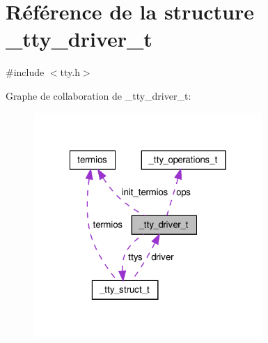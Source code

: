 \hypertarget{struct__tty__driver__t}{\section{Référence de la structure \-\_\-tty\-\_\-driver\-\_\-t}
\label{struct__tty__driver__t}
}


{\ttfamily \#include $<$tty.\-h$>$}



Graphe de collaboration de \-\_\-tty\-\_\-driver\-\_\-t\-:\nopagebreak
\begin{figure}[H]
\begin{center}
\leavevmode
\includegraphics[width=247pt]{struct__tty__driver__t__coll__graph}
\end{center}
\end{figure}
